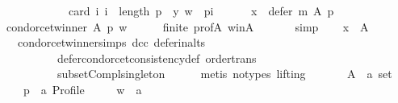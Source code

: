 \begin{isabellebody}
\ \ \ \ \ \ \ \ \ \ \ \ card\ {\isacharbraceleft}{\kern0pt}i{\isachardot}{\kern0pt}\ i\ {\isacharless}{\kern0pt}\ length\ p\ {\isasymand}\ {\isacharparenleft}{\kern0pt}y{\isacharcomma}{\kern0pt}\ w{\isacharparenright}{\kern0pt}\ {\isasymin}\ {\isacharparenleft}{\kern0pt}p{\isacharbang}{\kern0pt}i{\isacharparenright}{\kern0pt}{\isacharbraceright}{\kern0pt}{\isachardoublequoteclose}\ \isanewline
\ \ \ \ {}{\isacharcolon}{\kern0pt}\ {\isachardoublequoteopen}x\ {\isasymin}\ defer\ m\ A\ p{\isachardoublequoteclose}\isanewline
\ \ \isamarkupfalse%
\ {\isachardoublequoteopen}condorcet{\isacharunderscore}{\kern0pt}winner\ A\ p\ w{\isachardoublequoteclose}\isanewline
\ \ \ \ \isamarkupfalse%
\ finite\ prof{\isacharunderscore}{\kern0pt}A\ w{\isacharunderscore}{\kern0pt}in{\isacharunderscore}{\kern0pt}A\ {\isachardoublequoteopen}{}{\isachardoublequoteclose}\isanewline
\ \ \ \ \isamarkupfalse%
\ simp\isanewline
\ \ \isamarkupfalse%
\ {\isachardoublequoteopen}x\ {\isasymin}\ A{\isachardoublequoteclose}\isanewline
\ \ \ \ \isamarkupfalse%
\ {\isachardoublequoteopen}{}{\isachardoublequoteclose}\ {\isachardoublequoteopen}{}{\isachardoublequoteclose}\ condorcet{\isacharunderscore}{\kern0pt}winner{\isachardot}{\kern0pt}simps\ dcc\ defer{\isacharunderscore}{\kern0pt}in{\isacharunderscore}{\kern0pt}alts\isanewline
\ \ \ \ \ \ \ \ \ \ defer{\isacharunderscore}{\kern0pt}condorcet{\isacharunderscore}{\kern0pt}consistency{\isacharunderscore}{\kern0pt}def\ order{\isacharunderscore}{\kern0pt}trans\isanewline
\ \ \ \ \ \ \ \ \ \ subset{\isacharunderscore}{\kern0pt}Compl{\isacharunderscore}{\kern0pt}singleton\isanewline
\ \ \ \ \isamarkupfalse%
\ {\isacharparenleft}{\kern0pt}metis\ {\isacharparenleft}{\kern0pt}no{\isacharunderscore}{\kern0pt}types{\isacharcomma}{\kern0pt}\ lifting{\isacharparenright}{\kern0pt}{\isacharparenright}{\kern0pt}\isanewline
{}\isamarkupfalse%
\isanewline
\ \ \isamarkupfalse%
\isanewline
\ \ \ \ A\ {\isacharcolon}{\kern0pt}{\isacharcolon}{\kern0pt}\ {\isachardoublequoteopen}{\isacharprime}{\kern0pt}a\ set{\isachardoublequoteclose}\ \isanewline
\ \ \ \ p\ {\isacharcolon}{\kern0pt}{\isacharcolon}{\kern0pt}\ {\isachardoublequoteopen}{\isacharprime}{\kern0pt}a\ Profile{\isachardoublequoteclose}\ \isanewline
\ \ \ \ w\ {\isacharcolon}{\kern0pt}{\isacharcolon}{\kern0pt}\ {\isachardoublequoteopen}{\isacharprime}{\kern0pt}a{\isachardoublequoteclose}\ \isanewline

\end{isabellebody}
